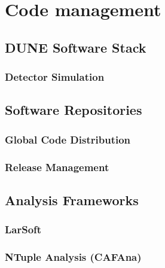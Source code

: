 %

\chapter{Code management}
\section{DUNE Software Stack}
\subsection{Detector Simulation}
\section{Software Repositories}
\subsection{Global Code Distribution}
\subsection{Release Management}
\section{Analysis Frameworks}
\subsection{LarSoft}
\subsection{NTuple Analysis (CAFAna)}
